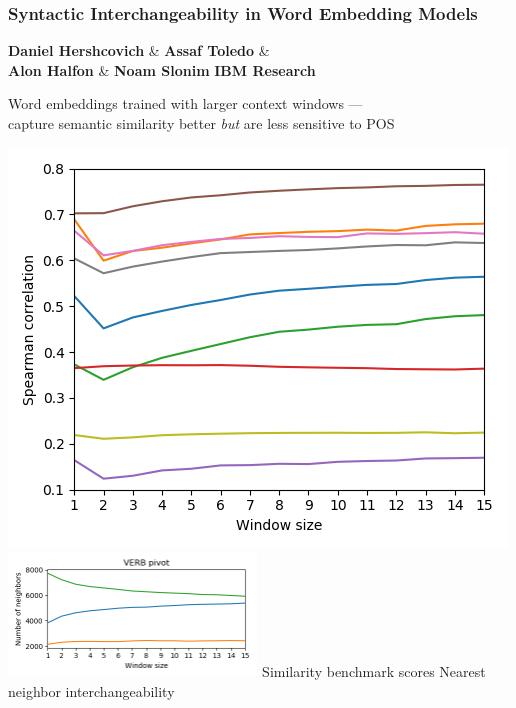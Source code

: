 \documentclass[t,xcolor={svgnames,table}]{beamer}
\begin{document}
\begin{frame}
\frametitle{Syntactic Interchangeability in Word Embedding Models}
  \textbf{Daniel Hershcovich} \& \textbf{Assaf Toledo} \& \\
  \textbf{Alon Halfon} \& \textbf{Noam Slonim}
  \hfill
  \textbf{IBM Research}
  \vfill
  
  \begin{adjustbox}{margin=5,frame,minipage=\textwidth,center,color=purple}
    Word embeddings trained with larger context windows --- \\
    capture semantic similarity better \textit{but} are less sensitive to POS
  \end{adjustbox}
  \vfill
  
  \includegraphics[width=.48\textwidth,trim=17mm 13mm 0 0,clip]{similarities_fasttext_enwiki-20170501-clean_cbow-300d-min500_eval.png}
  \includegraphics[width=.5\textwidth,trim=2cm 14mm 0 7.5mm,clip,height=33mm]{VERB_nn_100_fasttext_enwiki-20170501-clean_cbow-300d-min500_pos.png}
  Similarity benchmark scores \hfill Nearest neighbor interchangeability

\end{frame}
\end{document}
